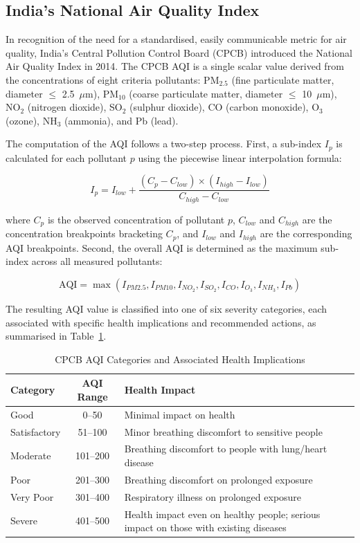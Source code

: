 \documentclass[12pt,a4paper]{report}
\begin{document}
\subsection{India's National Air Quality Index}

In recognition of the need for a standardised, easily communicable metric for air quality, India's Central Pollution Control Board (CPCB) introduced the National Air Quality Index in 2014. The CPCB AQI is a single scalar value derived from the concentrations of eight criteria pollutants: PM$_{2.5}$ (fine particulate matter, diameter $\leq$ 2.5~$\mu$m), PM$_{10}$ (coarse particulate matter, diameter $\leq$ 10~$\mu$m), NO$_2$ (nitrogen dioxide), SO$_2$ (sulphur dioxide), CO (carbon monoxide), O$_3$ (ozone), NH$_3$ (ammonia), and Pb (lead).

The computation of the AQI follows a two-step process. First, a sub-index $I_p$ is calculated for each pollutant $p$ using the piecewise linear interpolation formula:

\begin{equation}
I_p = I_{low} + \frac{(C_p - C_{low}) \times (I_{high} - I_{low})}{C_{high} - C_{low}}
\end{equation}

\noindent where $C_p$ is the observed concentration of pollutant $p$, $C_{low}$ and $C_{high}$ are the concentration breakpoints bracketing $C_p$, and $I_{low}$ and $I_{high}$ are the corresponding AQI breakpoints. Second, the overall AQI is determined as the maximum sub-index across all measured pollutants:

\begin{equation}
\text{AQI} = \max(I_{PM2.5}, I_{PM10}, I_{NO_2}, I_{SO_2}, I_{CO}, I_{O_3}, I_{NH_3}, I_{Pb})
\end{equation}

The resulting AQI value is classified into one of six severity categories, each associated with specific health implications and recommended actions, as summarised in Table~\ref{tab:aqi_categories}.

\begin{table}[H]
\centering
\caption{CPCB AQI Categories and Associated Health Implications}
\label{tab:aqi_categories}
\begin{tabular}{|l|c|p{7cm}|}
\hline
\textbf{Category} & \textbf{AQI Range} & \textbf{Health Impact} \\
\hline
Good & 0--50 & Minimal impact on health \\
\hline
Satisfactory & 51--100 & Minor breathing discomfort to sensitive people \\
\hline
Moderate & 101--200 & Breathing discomfort to people with lung/heart disease \\
\hline
Poor & 201--300 & Breathing discomfort on prolonged exposure \\
\hline
Very Poor & 301--400 & Respiratory illness on prolonged exposure \\
\hline
Severe & 401--500 & Health impact even on healthy people; serious impact on those with existing diseases \\
\hline
\end{tabular}
\end{table}
\end{document}
